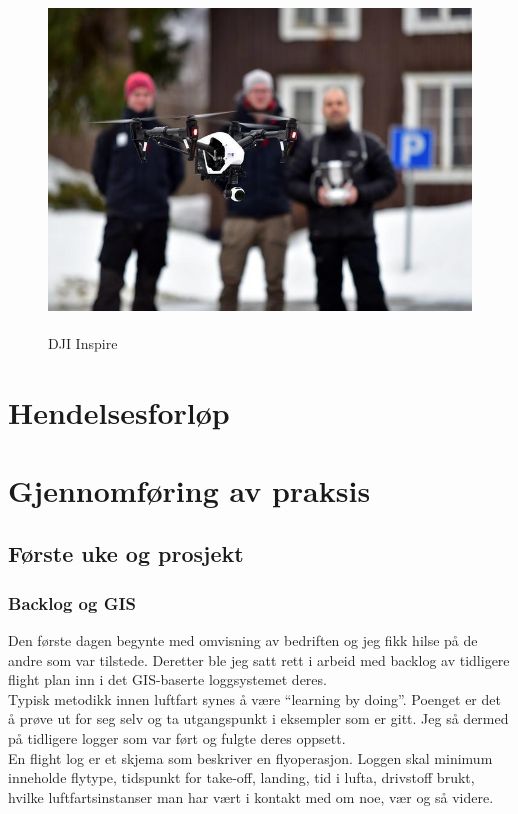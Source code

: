 \documentclass[12pt, a4paper]{article}
\begin{document}
\begin{figure}[h!]
	\centering
	\includegraphics[width = .6\textwidth, height = 9cm]{bilder/Dji_inspire.jpg}
	\caption{DJI Inspire}
\end{figure}



\newpage
\section{Hendelsesforløp}

\newpage
\section{Gjennomføring av praksis}

\subsection{Første uke og prosjekt}
\subsubsection{Backlog og GIS}
Den første dagen begynte med omvisning av bedriften og jeg fikk hilse på de andre som var tilstede. Deretter ble jeg satt rett i arbeid med backlog av tidligere flight plan inn i det GIS-baserte loggsystemet deres. \\
Typisk metodikk innen luftfart synes å være ``learning by doing''. Poenget er det å prøve ut for seg selv og ta utgangspunkt i eksempler som er gitt. Jeg så dermed på tidligere logger som var ført og fulgte deres oppsett.\\
En flight log er et skjema som beskriver en flyoperasjon. Loggen skal minimum inneholde flytype, tidspunkt for take-off, landing, tid i lufta, drivstoff brukt, hvilke luftfartsinstanser man har vært i kontakt med om noe, vær og så videre. 
\end{document}
